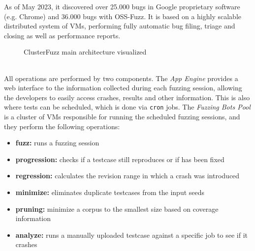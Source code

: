 As of May 2023, it discovered over 25.000 bugs in Google proprietary software (e.g. Chrome) and 36.000 bugs with OSS-Fuzz. \cite{clusterfuzz_docs}
It is based on a highly scalable distributed system of VMs, performing fully automatic bug filing, triage and closing as well as performance reports.
\begin{figure}[h]
\caption{ClusterFuzz main architecture visualized \cite{clusterfuzz_docs}}
\label{fig:clusterfuzz_architecture}
\end{figure}
\ \\
All operations are performed by two components.
The \textit{App Engine} provides a web interface to the information collected during each fuzzing session, allowing the developers to easily access crashes, results and other information. This is also where tests can be scheduled, which is done via \verb|cron| jobs.
The \textit{Fuzzing Bots Pool} is a cluster of VMs responsible for running the scheduled fuzzing sessions, and they perform the following operations:
\begin{itemize}
    \item \textbf{fuzz:} runs a fuzzing session
    \item \textbf{progression:} checks if a testcase still reproduces or if has been fixed
    \item \textbf{regression:} calculates the revision range in which a crash was introduced
    \item \textbf{minimize:} eliminates duplicate testcases from the input seeds
    \item \textbf{pruning:} minimize a corpus to the smallest size based on coverage information
    \item \textbf{analyze:} runs a manually uploaded testcase against a specific job to see if it crashes
\end{itemize}

